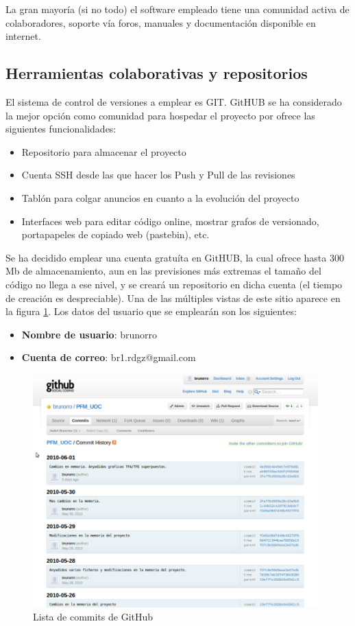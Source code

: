 La gran mayoría (si no todo) el software empleado tiene una comunidad activa de colaboradores, soporte vía foros, manuales y documentación disponible en internet. 
	

\subsection{Herramientas colaborativas y repositorios}
El sistema de control de versiones a emplear es GIT. GitHUB se ha considerado la mejor opción como comunidad para hospedar el proyecto por ofrece las siguientes funcionalidades:
\begin{itemize}
	\item{Repositorio para almacenar el proyecto}
	\item{Cuenta SSH desde las que hacer los Push y Pull de las revisiones}
	\item{Tablón para colgar anuncios en cuanto a la evolución del proyecto}
	\item{Interfaces web para editar código online, mostrar grafos de versionado, portapapeles de copiado web (pastebin), etc.}
\end{itemize}
Se ha decidido emplear una cuenta gratuíta en GitHUB, la cual ofrece hasta 300 Mb de almacenamiento, aun en las previsiones más extremas el tamaño del código no llega a ese nivel, y se creará un repositorio en dicha cuenta (el tiempo de creación es despreciable). Una de las múltiples vistas de este sitio aparece en la figura \ref{fig:interface_git}.  Los datos del usuario que se emplearán son los siguientes:
\begin{itemize}
	\item{\textbf{Nombre de usuario}: brunorro}
	\item{\textbf{Cuenta de correo}: br1.rdgz@gmail.com}
\end{itemize}

\begin{figure}
	\centering
	\includegraphics[width=11cm]{imagenes/interfazGit.png}
	\caption{Lista de commits de GitHub}
	\label{fig:interface_git}
\end{figure}

